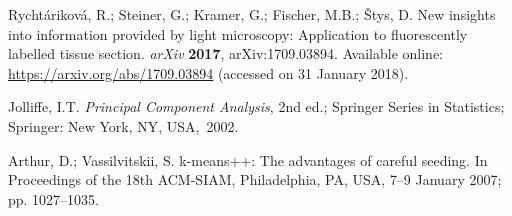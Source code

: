 \documentclass[entropy,article,accept,moreauthors,pdftex,10pt,a4paper]{mdpi}
\begin{document}
\begin{thebibliography}{00}




 Rycht\'{a}rikov\'{a}, R.; Steiner, G.; Kramer, G.; Fischer, M.B.; Štys, D. New insights into information provided by light microscopy: Application to fluorescently labelled tissue section. \emph{arXiv} \textbf{2017}, arXiv:1709.03894. Available online: \url{https://arxiv.org/abs/1709.03894} (accessed on 31 January 2018).

 Jolliffe, I.T.\emph{ Principal Component Analysis},  2nd ed.; Springer Series in Statistics; Springer: New York, NY, USA,~2002.

 Arthur, D.; Vassilvitskii, S. k-means++: The advantages of careful seeding. In Proceedings of the 18th ACM-SIAM, Philadelphia, PA, USA, {7--9 January 2007;} pp. 1027--1035.






\end{thebibliography}
\end{document}
